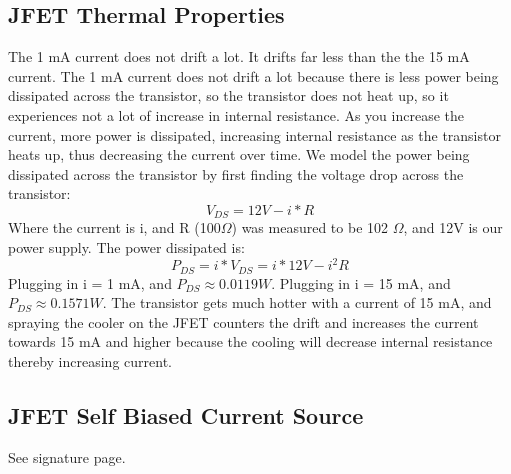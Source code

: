 \documentclass{article}
\begin{document}
\subsection{JFET Thermal Properties}
    The 1 mA current does not drift a lot. It drifts far less than the the 15 mA current. The 1 mA current does not drift a lot because there is less power being dissipated across the transistor, so the transistor does not heat up, so it experiences not a lot of increase in internal resistance. As you increase the current, more power is dissipated, increasing internal resistance as the transistor heats up, thus decreasing the current over time. We model the power being dissipated across the transistor by first finding the voltage drop across the transistor:
    \begin{equation}
        V_{DS} = 12V - i*R
    \end{equation}
    Where the current is i, and R (100$\Omega$) was measured to be 102 $\Omega$, and 12V is our power supply. The power dissipated is:
    \begin{equation}
        P_{DS} = i*V_{DS} = i*12V - i^{2}R
    \end{equation}
    Plugging in i = 1 mA, and $P_{DS} \approx 0.0119W$. Plugging in i = 15 mA, and $P_{DS} \approx 0.1571W$. The transistor gets much hotter with a current of 15 mA, and spraying the cooler on the JFET counters the drift and increases the current towards 15 mA and higher because the cooling will decrease internal resistance thereby increasing current.

\subsection{JFET Self Biased Current Source}
    See signature page.
    
\end{document}
